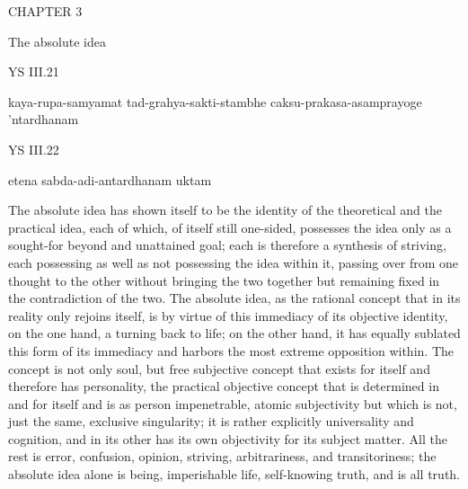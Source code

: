 CHAPTER 3

The absolute idea

YS III.21

    kaya-rupa-samyamat tad-grahya-sakti-stambhe caksu-prakasa-asamprayoge 'ntardhanam

YS III.22

    etena sabda-adi-antardhanam uktam

The absolute idea has shown itself to be
the identity of the theoretical and the practical idea,
each of which, of itself still one-sided, possesses the idea
only as a sought-for beyond and unattained goal;
each is therefore a synthesis of striving,
each possessing as well as not possessing the idea within it,
passing over from one thought to the other
without bringing the two together
but remaining fixed in the contradiction of the two.
The absolute idea, as the rational concept
that in its reality only rejoins itself,
is by virtue of this immediacy of its objective identity,
on the one hand, a turning back to life;
on the other hand, it has equally
sublated this form of its immediacy
and harbors the most extreme opposition within.
The concept is not only soul,
but free subjective concept
that exists for itself
and therefore has personality,
the practical objective concept
that is determined in and for itself
and is as person impenetrable, atomic subjectivity
but which is not, just the same, exclusive singularity;
it is rather explicitly universality and cognition,
and in its other has its own objectivity for its subject matter.
All the rest is error, confusion, opinion,
striving, arbitrariness, and transitoriness;
the absolute idea alone is being, imperishable life,
self-knowing truth, and is all truth.

